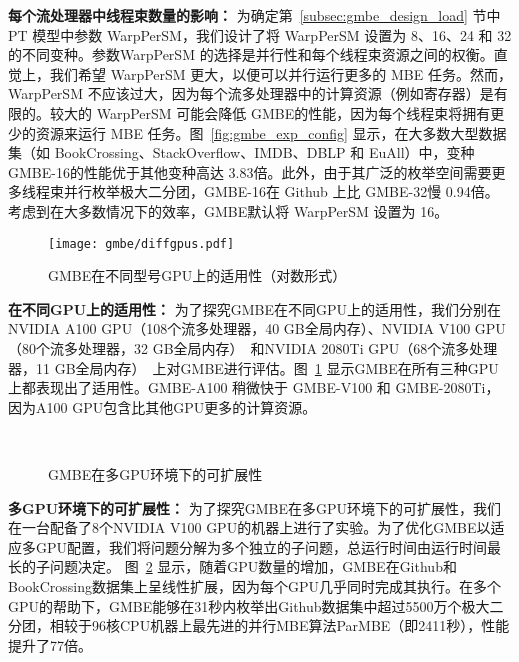 \textbf{每个流处理器中线程束数量的影响：} 为确定第~\ref{subsec:gmbe_design_load} 节中 PT 模型中参数 \textsf{WarpPerSM}，我们设计了将 \textsf{WarpPerSM} 设置为 8、16、24 和 32 的不同变种。参数\textsf{WarpPerSM} 的选择是并行性和每个线程束资源之间的权衡。直觉上，我们希望 \textsf{WarpPerSM} 更大，以便可以并行运行更多的 MBE 任务。然而，\textsf{WarpPerSM} 不应该过大，因为每个流多处理器中的计算资源（例如寄存器）是有限的。较大的 \textsf{WarpPerSM} 可能会降低 GMBE的性能，因为每个线程束将拥有更少的资源来运行 MBE 任务。图~\ref{fig:gmbe_exp_config} 显示，在大多数大型数据集（如 BookCrossing、StackOverflow、IMDB、DBLP 和 EuAll）中，变种 GMBE-16的性能优于其他变种高达 3.83倍。此外，由于其广泛的枚举空间需要更多线程束并行枚举极大二分团，GMBE-16在 Github 上比 GMBE-32慢 0.94倍。考虑到在大多数情况下的效率，GMBE默认将 \textsf{WarpPerSM} 设置为 16。

\begin{figure} [H]
	\centering
	\texttt{[image: gmbe/diffgpus.pdf]}	
	\vspace{0.1in}
  \caption{GMBE在不同型号GPU上的适用性（对数形式）}
	\label{fig:gmbe_exp_diff}
\end{figure}

\textbf{在不同GPU上的适用性：} 为了探究GMBE在不同GPU上的适用性，我们分别在NVIDIA A100 GPU（108个流多处理器，40 GB全局内存）、NVIDIA V100 GPU（80个流多处理器，32 GB全局内存）~\cite{NVIDIA-V100}和NVIDIA 2080Ti GPU（68个流多处理器，11 GB全局内存）~\cite{NVIDIA-2080Ti}上对GMBE进行评估。图~\ref{fig:gmbe_exp_diff} 显示GMBE在所有三种GPU上都表现出了适用性。GMBE-A100 稍微快于 GMBE-V100 和 GMBE-2080Ti，因为A100 GPU包含比其他GPU更多的计算资源。

\begin{figure} [t]
	\centering

	 \\


	\caption{GMBE在多GPU环境下的可扩展性}

	\label{fig:gmbe_exp_scale}

\end{figure}

\textbf{多GPU环境下的可扩展性：} 为了探究GMBE在多GPU环境下的可扩展性，我们在一台配备了8个NVIDIA V100 GPU的机器上进行了实验。为了优化GMBE以适应多GPU配置，我们将问题分解为多个独立的子问题，总运行时间由运行时间最长的子问题决定。 图~\ref{fig:gmbe_exp_scale} 显示，随着GPU数量的增加，GMBE在Github和BookCrossing数据集上呈线性扩展，因为每个GPU几乎同时完成其执行。在多个GPU的帮助下，GMBE能够在31秒内枚举出Github数据集中超过5500万个极大二分团，相较于96核CPU机器上最先进的并行MBE算法ParMBE（即2411秒），性能提升了77倍。

